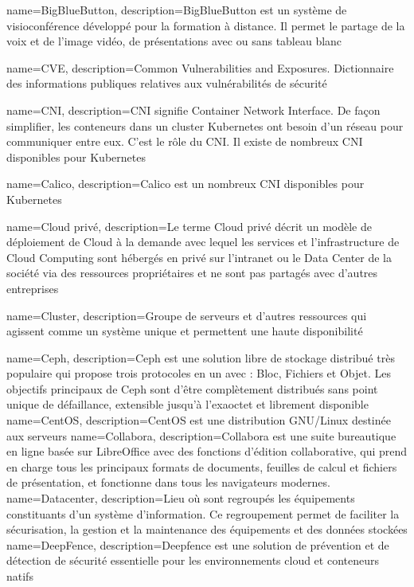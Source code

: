 {
    name=BigBlueButton,
    description={BigBlueButton est un système de visioconférence développé pour la formation à distance. Il permet le partage de la voix et de l'image vidéo, de présentations avec ou sans tableau blanc}
}

{
    name=CVE,
    description={Common Vulnerabilities and Exposures. Dictionnaire des informations publiques relatives aux vulnérabilités de sécurité}
}

{
    name=CNI,
    description={CNI signifie Container Network Interface. De façon simplifier, les conteneurs dans un cluster Kubernetes ont besoin d'un réseau pour communiquer entre eux. C'est le rôle du CNI. Il existe de nombreux CNI disponibles pour Kubernetes}
}

{
    name=Calico,
    description={Calico est un nombreux CNI disponibles pour Kubernetes}
}

{
    name=Cloud privé,
    description={Le terme Cloud privé décrit un modèle de déploiement de Cloud à la demande avec lequel les services et l'infrastructure de Cloud Computing sont hébergés en privé sur l'intranet ou le Data Center de la société via des ressources propriétaires et ne sont pas partagés avec d'autres entreprises}
}

{
    name=Cluster,
    description={Groupe de serveurs et d’autres ressources qui agissent comme un système unique et permettent une haute disponibilité}
}

{
    name=Ceph,
    description={Ceph est une solution libre de stockage distribué très populaire qui propose trois protocoles en un avec : Bloc, Fichiers et Objet. Les objectifs principaux de Ceph sont d'être complètement distribués sans point unique de défaillance, extensible jusqu'à l'exaoctet et librement disponible}
}
{
    name=CentOS,
    description={CentOS est une distribution GNU/Linux destinée aux serveurs}
}
{
    name=Collabora,
    description={Collabora est une suite bureautique en ligne basée sur LibreOffice avec des fonctions d'édition collaborative, qui prend en charge tous les principaux formats de documents, feuilles de calcul et fichiers de présentation, et fonctionne dans tous les navigateurs modernes.}
}
{
    name=Datacenter,
    description={Lieu où sont regroupés les équipements constituants d'un système d'information. Ce regroupement permet de faciliter la sécurisation, la gestion et la maintenance des équipements et des données stockées}
}
{
    name=DeepFence,
    description={Deepfence est une solution de prévention et de détection de sécurité essentielle pour les environnements cloud et conteneurs natifs}
}

